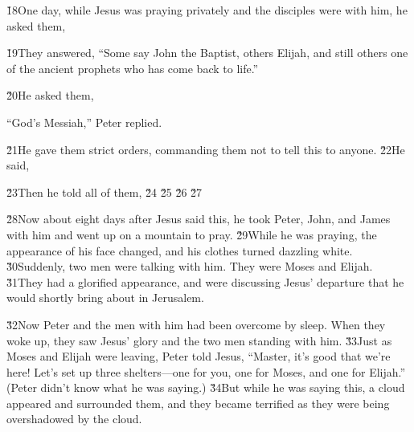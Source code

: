 \v{18}One day, while Jesus was praying privately and the disciples were with him, he asked them, 

\v{19}They answered, ``Some say John the Baptist, others Elijah, and still others one of the ancient prophets who has come back to life.''

\v{20}He asked them, 

``God's Messiah,'' Peter replied.

\v{21}He gave them strict orders, commanding them not to tell this to anyone. \v{22}He said, 

\v{23}Then he told all of them,  \v{24} \v{25} \v{26} \v{27}

\v{28}Now about eight days after Jesus said this, he took Peter, John, and James with him and went up on a mountain to pray. \v{29}While he was praying, the appearance of his face changed, and his clothes turned dazzling white. \v{30}Suddenly, two men were talking with him. They were Moses and Elijah. \v{31}They had a glorified appearance, and were discussing Jesus' departure that he would shortly bring about in Jerusalem.

\v{32}Now Peter and the men with him had been overcome by sleep. When they woke up, they saw Jesus' glory and the two men standing with him. \v{33}Just as Moses and Elijah were leaving, Peter told Jesus, ``Master, it's good that we're here! Let's set up three shelters---one for you, one for Moses, and one for Elijah.'' (Peter didn't know what he was saying.) \v{34}But while he was saying this, a cloud appeared and surrounded them, and they became terrified as they were being overshadowed by the cloud.

